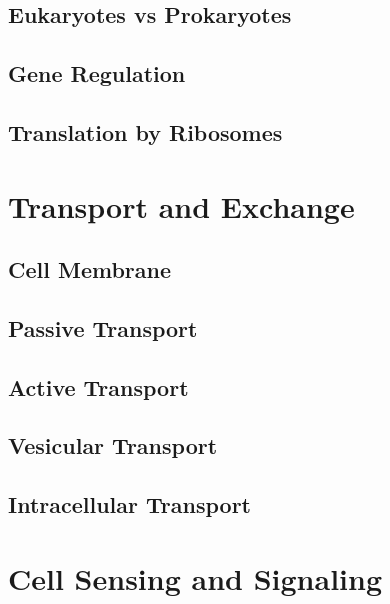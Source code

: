 \documentclass[12pt]{cheatsheet}
\begin{document}
\subsection*{Eukaryotes vs Prokaryotes}

\subsection*{Gene Regulation}

\subsection*{Translation by Ribosomes}



\section*{Transport and Exchange}
\subsection*{Cell Membrane}

\subsection*{Passive Transport}

\begin{minipage}{0.45\linewidth}
\subsection*{Active Transport}

\end{minipage}
\vline \hspace{1mm}
\begin{minipage}{0.5\linewidth}
\subsection*{Vesicular Transport}

\vspace{5mm}
\end{minipage}
\subsection*{Intracellular Transport}


\section*{Cell Sensing and Signaling}
\end{document}
